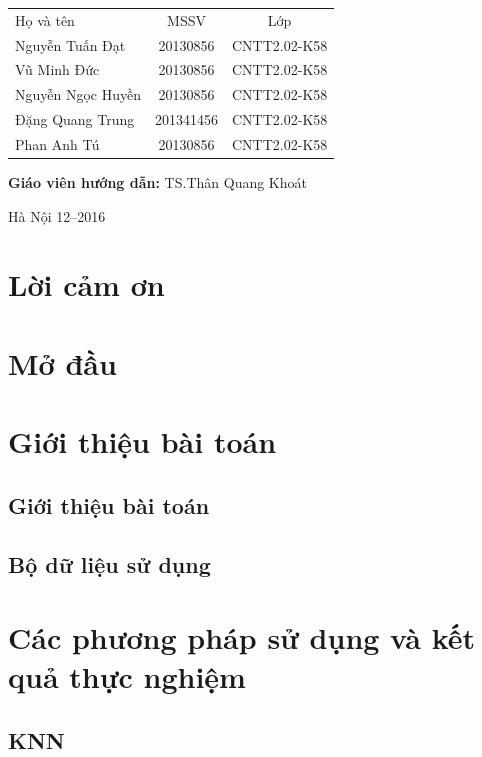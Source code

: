\documentclass[a4paper,12pt]{report}
\renewcommand{\contentsname}{Mục lục}
\begin{document}
\begin{longtable}{l c c}

Họ và tên & MSSV  & Lớp\\
Nguyễn Tuấn Đạt & 20130856 & CNTT2.02-K58 \\
Vũ Minh Đức & 20130856 & CNTT2.02-K58 \\
Nguyễn Ngọc Huyền & 20130856 & CNTT2.02-K58 \\
Đặng Quang Trung & 201341456 & CNTT2.02-K58 \\
Phan Anh Tú & 20130856 & CNTT2.02-K58 \\

\end{longtable}

\hspace{1cm}\fontsize{14}{16}\selectfont \textbf{Giáo viên hướng dẫn: }TS.Thân Quang Khoát \\[1.5cm]
\begin{center}
\fontsize{16}{19}\selectfont Hà Nội 12--2016

\end{center}
\newpage
\pdfbookmark{\contentsname}{toc}
\tableofcontents
\chapter*{Lời cảm ơn}
{}

\listoffigures
\chapter{Mở đầu}
\chapter{Giới thiệu bài toán}
\section{Giới thiệu bài toán}
\section{Bộ dữ liệu sử dụng}
\chapter{Các phương pháp sử dụng và kết quả thực nghiệm}
\section{KNN}
\end{document}
